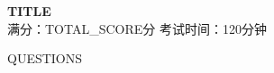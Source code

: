 \documentclass[12pt,a4paper]{article}
\begin{document}
\begin{center}
\LARGE{\textbf{{TITLE}}}\\[0.3cm]
\large{满分：{TOTAL_SCORE}分 \quad 考试时间：120分钟}
\end{center}
\vspace{0.5cm}
{QUESTIONS}
\end{document}
